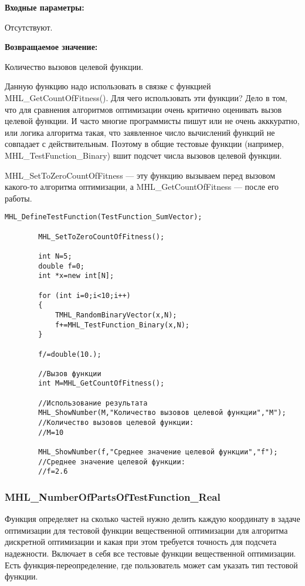 \documentclass[a4paper,12pt]{article}
\begin{document}
\textbf{Входные параметры:}

Отсутствуют.

\textbf{Возвращаемое значение:}
 
Количество вызовов целевой функции.

Данную функцию надо использовать в связке с функцией MHL\_GetCountOfFitness(). Для чего использовать эти функции? Дело в том, что для сравнения алгоритмов оптимизации очень критично оценивать вызов целевой функции. И часто многие программисты пишут или не очень акккуратно, или логика алгоритма такая, что заявленное число вычислений функций не совпадает с действительным. Поэтому в общие тестовые функции (например, MHL\_TestFunction\_Binary) вшит подсчет числа вызовов целевой функции.

MHL\_SetToZeroCountOfFitness --- эту функцию вызываем перед вызовом какого-то алгоритма оптимизации, а MHL\_GetCountOfFitness --- после его работы.


\begin{lstlisting}[label=code_use_MHL_GetCountOfFitness,caption=Пример использования]
        MHL_DefineTestFunction(TestFunction_SumVector);

        MHL_SetToZeroCountOfFitness();

        int N=5;
        double f=0;
        int *x=new int[N];

        for (int i=0;i<10;i++)
        {
            TMHL_RandomBinaryVector(x,N);
            f+=MHL_TestFunction_Binary(x,N);
        }

        f/=double(10.);

        //Вызов функции
        int M=MHL_GetCountOfFitness();

        //Использование результата
        MHL_ShowNumber(M,"Количество вызовов целевой функции","M");
        //Количество вызовов целевой функции:
        //M=10

        MHL_ShowNumber(f,"Среднее значение целевой функции","f");
        //Среднее значение целевой функции:
        //f=2.6
\end{lstlisting}

\subsubsection{MHL\_NumberOfPartsOfTestFunction\_Real}\label{MHL_NumberOfPartsOfTestFunction_Real}

Функция определяет на сколько частей нужно делить каждую координату в задаче оптимизации для тестовой функции вещественной оптимизации для алгоритма дискретной оптимизации и какая при этом требуется точность для подсчета надежности. Включает в себя все тестовые функции вещественной оптимизации. Есть функция-переопределение, где пользователь может сам указать тип тестовой функции.
\end{document}

